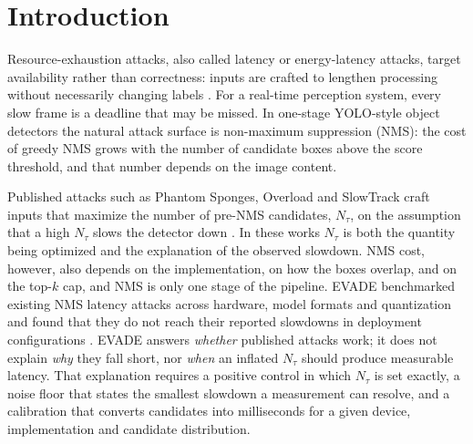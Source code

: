 \documentclass[a4paper,fleqn]{cas-dc}
\newcommand{\Ntau}{N_{\tau}}
\begin{document}
\maketitle

\section{Introduction}
Resource-exhaustion attacks, also called latency or energy-latency attacks, target availability rather than correctness: inputs are crafted to lengthen processing without necessarily changing labels \cite{shumailov2021sponge,nicgslowdown2022}. For a real-time perception system, every slow frame is a deadline that may be missed. In one-stage YOLO-style object detectors the natural attack surface is non-maximum suppression (NMS): the cost of greedy NMS grows with the number of candidate boxes above the score threshold, and that number depends on the image content.

Published attacks such as Phantom Sponges, Overload and SlowTrack craft inputs that maximize the number of pre-NMS candidates, $\Ntau$, on the assumption that a high $\Ntau$ slows the detector down \cite{phantom2023,overload2024,slowtrack2024}. In these works $\Ntau$ is both the quantity being optimized and the explanation of the observed slowdown. NMS cost, however, also depends on the implementation, on how the boxes overlap, and on the top-$k$ cap, and NMS is only one stage of the pipeline. EVADE benchmarked existing NMS latency attacks across hardware, model formats and quantization and found that they do not reach their reported slowdowns in deployment configurations \cite{evade2025}. EVADE answers \emph{whether} published attacks work; it does not explain \emph{why} they fall short, nor \emph{when} an inflated $\Ntau$ should produce measurable latency. That explanation requires a positive control in which $\Ntau$ is set exactly, a noise floor that states the smallest slowdown a measurement can resolve, and a calibration that converts candidates into milliseconds for a given device, implementation and candidate distribution.
\end{document}
